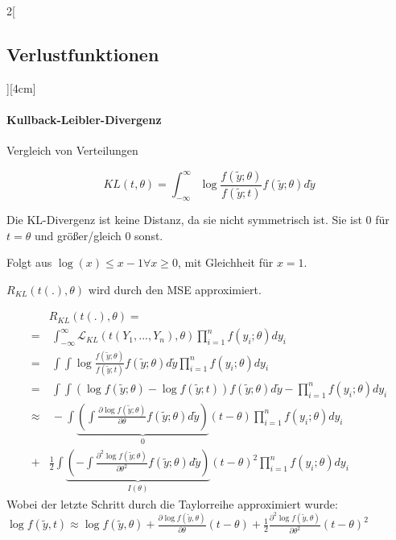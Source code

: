 \documentclass[8pt]{extarticle}
\begin{document}
\begin{multicols}{2}[\subsection{Verlustfunktionen}][4cm]
\paragraph{Kullback-Leibler-Divergenz} Vergleich von Verteilungen

$$KL(t,\theta) = \int_{-\infty}^\infty \log\frac{f(\tilde{y};\theta)}{f(\tilde{y};t)} f(\tilde{y};\theta) d\tilde{y}$$

\noindent Die KL-Divergenz ist keine Distanz, da sie nicht symmetrisch ist.
\noindent Sie ist 0 für $t=\theta$ und größer/gleich 0 sonst.
\begin{Beweis}
Folgt aus $\log (x) \leq x-1 \forall x \geq 0$, mit Gleichheit für $x=1$.
\end{Beweis}

\noindent $R_{KL} (t(.), \theta)$ wird durch den MSE approximiert.
\begin{Beweis}
\vspace{-1.5em}
\begin{align*}
& R_{KL} (t(.), \theta) = \\ =&\: \int_{-\infty}^\infty \mathcal{L}_{KL}(t(Y_1,...,Y_n),\theta) \prod_{i=1}^n f(y_i;\theta)dy_i \\
=&\: \int\int \log\frac{f(\tilde{y};\theta)}{f(\tilde{y};t)} f(\tilde{y};\theta) d\tilde{y} \prod_{i=1}^n f(y_i;\theta)dy_i \\
=&\: \int\int \left(\log f(\tilde{y};\theta) - \log f(\tilde{y};t) \right) f(\tilde{y};\theta) d\tilde{y} - \prod_{i=1}^n f(y_i;\theta)dy_i \\
\approx & \: - \int \underbrace{\left( \int \frac{\partial \log f(\tilde{y};\theta)}{\partial \theta} f(\tilde{y};\theta)d\tilde{y}\right)}_{0}\left(t-\theta\right) \prod_{i=1}^n f(y_i;\theta)dy_i  \\
+ &  \frac{1}{2} \int \underbrace{\left( - \int \frac{\partial^2 \log f(\tilde{y};\theta)}{\partial \theta^2} f(\tilde{y};\theta)d\tilde{y}\right)}_{I(\theta)}\left(t-\theta\right)^2 \prod_{i=1}^n f(y_i;\theta)dy_i 
\end{align*}
Wobei der letzte Schritt durch die Taylorreihe approximiert wurde:
$\log f(\tilde{y}, t) \approx \log f(\tilde{y},\theta) + \frac{\partial\log f(\tilde{y}, \theta)}{\partial\theta} (t-\theta) + \frac{1}{2} \frac{\partial^2\log f(\tilde{y}, \theta)}{\partial\theta^2} (t-\theta)^2$
\end{Beweis}
\end{multicols}
\end{document}
